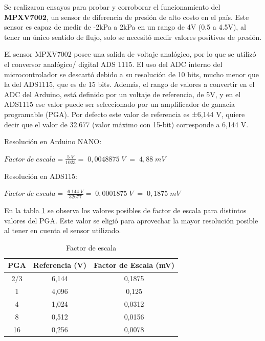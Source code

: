 Se realizaron ensayos para probar y corroborar el funcionamiento del \textbf{MPXV7002}, un sensor de diferencia de presión de alto costo en el país. Este sensor es capaz de medir de -2kPa a 2kPa en un rango de 4V (0.5 a 4.5V), al tener un único sentido de flujo, solo se necesitó medir valores positivos de presión.

El sensor MPXV7002 posee una salida de voltaje analógico, por lo que se utilizó el conversor analógico/ digital ADS 1115. El uso del ADC interno del microcontrolador se descartó debido a su resolución de 10 bits, mucho menor que la del ADS1115, que es de 15 bits. Además, el rango de valores a convertir en el ADC del Arduino, está definido por un voltaje de referencia, de 5V, y en el ADS1115 ese valor puede ser seleccionado por un amplificador de ganacia programable (PGA). Por defecto este valor de referencia es ±6,144 V, quiere decir que el valor de 32.677 (valor máximo con 15-bit) corresponde a 6,144 V. 

Resolución en Arduino NANO:
\begin{center}
	\begin{math}Factor\;de\;escala=\frac{5\;V}{1023}=\;0,0048875\;V\;=\;4,88\;mV
	\end{math}
\end{center}

Resolución en ADS115:
\begin{center}
	\begin{math}Factor\;de\;escala=\;\frac{6.144\;V}{32677}=\;0,0001875\;V\;=\;0,1875\;mV
	\end{math}
\end{center}

En la tabla \ref{tab:Reso} se observa los valores posibles de factor de escala para distintos valores del PGA. Este valor se eligió para aprovechar la mayor resolución posible al tener en cuenta el sensor utilizado.
\begin{table}[h]
	\centering
	\begin{tabular}{|c|c|c|}
		\hline
		\textbf{PGA} & \textbf{Referencia (V)} & \textbf{Factor de Escala (mV)} \\ \hline
		2/3          & 6,144                   & 0,1875                         \\ \hline
		1            & 4,096                   & 0,125                          \\ \hline
		4            & 1,024                   & 0,0312                         \\ \hline
		8            & 0,512                   & 0,0156                         \\ \hline
		16           & 0,256                   & 0,0078                         \\ \hline
	\end{tabular}
\caption{Factor de escala}
\label{tab:Reso}
\end{table}

